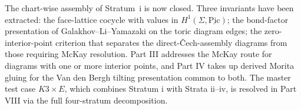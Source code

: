 \bigskip

The chart-wise assembly of Stratum~i is now closed.  Three invariants have
been extracted: the face-lattice cocycle with values in
$H^1(\Sigma, \underline{\mathrm{Pic}})$; the bond-factor presentation of
Galakhov--Li--Yamazaki on the toric diagram edges; the zero-interior-point
criterion that separates the direct-\v{C}ech-assembly diagrams from those
requiring McKay resolution.  Part III addresses the McKay route for
diagrams with one or more interior points, and Part IV takes up derived
Morita gluing for the Van den Bergh tilting presentation common to
both.  The master test case $K3 \times E$, which combines Stratum i with
Strata ii--iv, is resolved in Part VIII via the full four-stratum
decomposition.

